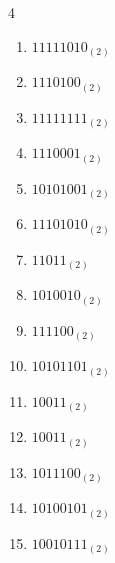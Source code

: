 \begin{multicols}{4}
\begin{enumerate}
        \phantom{$=133$}

  \item $11111010_{(2)}$

        \phantom{$=250$}

\columnbreak %

\resetques

  \item $1110100_{(2)}$

        \phantom{$=116$}

  \item $11111111_{(2)}$

        \phantom{$=255$}

  \item $1110001_{(2)}$

        \phantom{$=113$}

  \item $10101001_{(2)}$

        \phantom{$=169$}

  \item $11101010_{(2)}$

        \phantom{$=234$}

  \item $11011_{(2)}$

        \phantom{$=27$}

  \item $1010010_{(2)}$

        \phantom{$=82$}

  \item $111100_{(2)}$

        \phantom{$=60$}

  \item $10101101_{(2)}$

        \phantom{$=173$}

  \item $10011_{(2)}$

        \phantom{$=19$}

  \item $10011_{(2)}$

        \phantom{$=19$}

  \item $1011100_{(2)}$

        \phantom{$=92$}

  \item $10100101_{(2)}$

        \phantom{$=165$}

  \item $10010111_{(2)}$


\end{enumerate}
\end{multicols}
